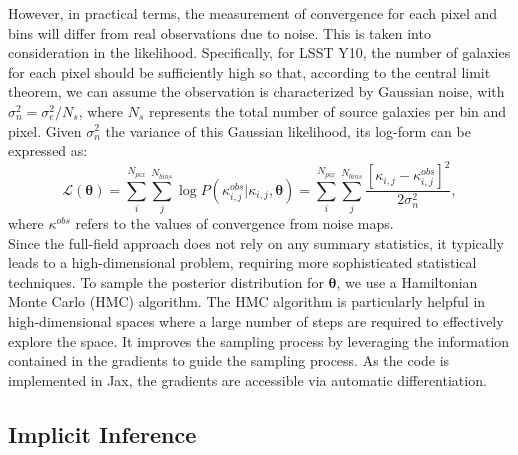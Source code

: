 \documentclass{aa}
\begin{document}
However, in practical terms, the measurement of convergence for each pixel and bins will differ from real observations due to noise. This is taken into consideration in the likelihood. Specifically, for LSST Y10, the number of galaxies for each pixel should be sufficiently high so that, according to the central limit theorem, we can assume the observation is characterized by Gaussian noise, with $\sigma_n^2=\sigma_e^2/N_s$, where $N_s$ represents the total number of source galaxies per bin and pixel. Given $\sigma_n^2$ the variance of this Gaussian likelihood, its log-form can be expressed as:
\begin{equation}
    \mathcal{L}(\bm{\theta})=
    \sum_i^{N_{pix}} \sum_{j}^{N_{bins}} \log{P(\kappa^{obs}_{i,j}|\kappa_{i,j},\bm{\theta})}
    =\sum_i^{N_{pix}} \sum_{j}^{N_{bins}}\frac{[\kappa_{i,j}-\kappa^{obs}_{i,j}]^2}{2\sigma_n^2},
\end{equation}
where $\kappa^{obs}$ refers to the values of convergence from noise maps. \\
Since the full-field approach does not rely on any summary statistics, it typically leads to a high-dimensional problem, requiring more sophisticated statistical techniques. To sample the posterior distribution for $\bm{\theta}$, we use a Hamiltonian Monte Carlo (HMC) algorithm. The HMC algorithm is particularly helpful in high-dimensional spaces where a large number of steps are required to effectively explore the space. It improves the sampling process by leveraging the information contained in the gradients to guide the sampling process. As the code is implemented in Jax, the gradients are accessible via automatic differentiation. 
\subsection{Implicit Inference}
\end{document}

